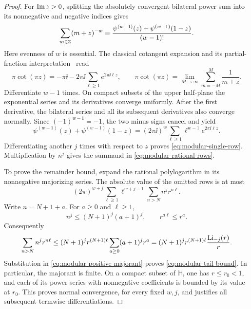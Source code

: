 \begin{proof}
For \(\operatorname{Im} z>0\), splitting the absolutely convergent bilateral
power sum into its nonnegative and negative indices gives
\begin{equation}
\sum_{m\in\mathbb{Z}}(m+z)^{-w}
=\frac{\psi^{(w-1)}(z)+\psi^{(w-1)}(1-z)}{(w-1)!}.
\label{eq:modular-bilateral-polygamma}
\end{equation}
Here evenness of \(w\) is essential. The classical cotangent expansion
and its partial-fraction interpretation~\cite{DLMF} read
\[
\pi\cot(\pi z)=-\pi\ii
 -2\pi\ii\sum_{\ell\ge1}e^{2\pi\ii\ell z},\qquad
\pi\cot(\pi z)=\lim_{M\to\infty}\sum_{m=-M}^{M}\frac1{m+z}.
\]
Differentiate \(w-1\) times. On compact subsets of the upper
half-plane the exponential series and its derivatives converge
uniformly. After the first derivative, the bilateral series and all
its subsequent derivatives also converge normally. Since
\((-1)^{w-1}=-1\), the two minus signs cancel and yield
\[
\psi^{(w-1)}(z)+\psi^{(w-1)}(1-z)
=(2\pi\ii)^w\sum_{\ell\ge1}\ell^{w-1}e^{2\pi\ii\ell z}.
\]
Differentiating another \(j\) times with respect to \(z\) proves
\eqref{eq:modular-single-row}. Multiplication by \(n^j\) gives the
summand in \eqref{eq:modular-rational-rows}.

To prove the remainder bound, expand the rational polylogarithm in
its nonnegative majorizing series. The absolute value of the omitted
rows is at most
\begin{equation}
(2\pi)^{w+j}\sum_{\ell\ge1}\ell^{w+j-1}
                  \sum_{n>N}n^j r^{n\ell}.
\label{eq:modular-positive-majorant}
\end{equation}
Write \(n=N+1+a\). For \(a\ge0\) and \(\ell\ge1\),
\[
n^j\le(N+1)^j(a+1)^j,\qquad r^{a\ell}\le r^a.
\]
Consequently
\[
\sum_{n>N}n^j r^{n\ell}
\le (N+1)^j r^{(N+1)\ell}
       \sum_{a\ge0}(a+1)^j r^a
=(N+1)^j r^{(N+1)\ell}\frac{\operatorname{Li}_{-j}(r)}{r}.
\]
Substitution in \eqref{eq:modular-positive-majorant} proves
\eqref{eq:modular-tail-bound}. In particular, the majorant is finite.
On a compact subset of \(\mathbb H\), one has \(r\le r_0<1\), and
each of its power series with nonnegative coefficients is bounded by
its value at \(r_0\). This proves normal convergence, for every fixed
\(w,j\), and justifies all subsequent termwise differentiations.
\end{proof}

